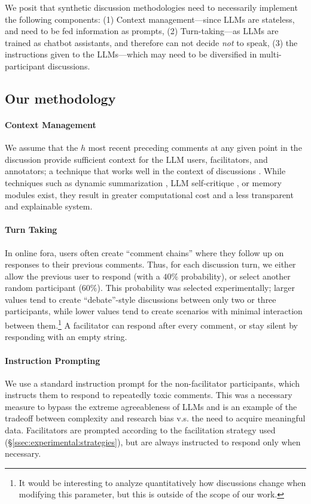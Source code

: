 We posit that synthetic discussion methodologies need to necessarily implement the following components: (1) Context management---since LLMs are stateless, and need to be fed information as prompts, (2) Turn-taking---as LLMs are trained as chatbot assistants, and therefore can not decide \emph{not} to speak, (3) the instructions given to the LLMs---which may need to be diversified in multi-participant discussions.

\subsection{Our methodology}
\label{ssec:methodology:us}

\paragraph{Context Management}
We assume that the $h$ most recent preceding comments at any given point in the discussion provide sufficient context for the LLM users, facilitators, and annotators; a technique that works well in the context of discussions \cite{pavlopoulos_2020_toxicity}. While techniques such as dynamic summarization \cite{balog_2024}, LLM self-critique \cite{yu_2024_fincon}, or memory modules \cite{Vezhnevets2023GenerativeAM} exist, they result in greater computational cost and a less transparent and explainable system.


\paragraph{Turn Taking} In online fora, users often create ``comment chains'' where they follow up on responses to their previous comments. Thus, for each discussion turn, we either allow the previous user to respond (with a $40\%$ probability), or select another random participant ($60\%$). This probability was selected experimentally; larger values tend to create ``debate''-style discussions between only two or three participants, while lower values tend to create scenarios with minimal interaction between them.\footnote{It would be interesting to analyze quantitatively how discussions change when modifying this parameter, but this is outside of the scope of our work.} A facilitator can respond after every comment, or stay silent by responding with an empty string.


\paragraph{Instruction Prompting} We use a standard instruction prompt for the non-facilitator participants, which instructs them to respond to repeatedly toxic comments. This was a necessary measure to bypass the extreme agreeableness of LLMs \cite{park2023game,anthis_2025} and is an example of the tradeoff between complexity and research bias v.s. the need to acquire meaningful data. Facilitators are prompted according to the facilitation strategy used (\S\ref{ssec:experimental:strategies}), but are always instructed to respond only when necessary.

